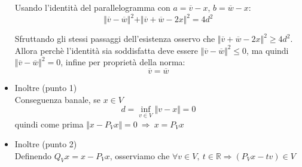 \documentclass[10pt,a4paper,twoside,openright]{book}
\begin{document}
\begin{dimostrazione}
\begin{itemize}
              Usando l'identità del parallelogramma con $a=\overline{v} -x$, $b=\overline{w} -x$:
              \begin{equation*}
                  \Vert \overline{v} -\overline{w}\Vert ^{2} +\Vert \overline{v} +\overline{w} -2x\Vert ^{2} =4d^{2}
              \end{equation*}

              Sfruttando gli stessi passaggi dell'esistenza osservo che $\Vert \overline{v} +\overline{w} -2x\Vert ^{2} \geqslant 4d^{2}$. Allora perchè l'identità sia soddisfatta deve essere $\Vert \overline{v} -\overline{w}\Vert ^{2} \leqslant 0$, ma quindi $\Vert \overline{v} -\overline{w}\Vert ^{2} =0$, infine per proprietà della norma:
              \begin{equation*}
                  \overline{v} =\overline{w}
              \end{equation*}
        \item Inoltre (punto 1)\\
              Conseguenza banale, se $x\in V$
              \begin{equation*}
                  d=\inf_{v\in V}\Vert v-x\Vert =0
              \end{equation*}
              quindi come prima $\Vert x-P_{V} x\Vert =0\ \Rightarrow \ x=P_{V} x$
        \item Inoltre (punto 2)\\
              Definendo $Q_{V} x=x-P_{V} x$, osserviamo che $\forall v\in V,\ t\in \mathbb{R} \Longrightarrow (P_{V} x-tv) \in V$




              \begin{figure}[H]
                  \centering


                  \begin{tikzpicture}[x=0.75pt,y=0.75pt,yscale=-1,xscale=1]


\end{tikzpicture}
\end{figure}
\end{itemize}
\end{dimostrazione}
\end{document}
